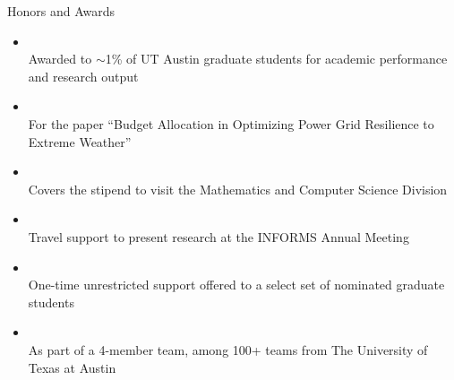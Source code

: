 \begin{rSection}{Honors and Awards}
\begin{itemize}
    \item {}\\
    {\small Awarded to $\sim$1\% of UT Austin graduate students for academic performance and research output}
    \item {}\\
    {\small For the paper ``Budget Allocation in Optimizing Power Grid Resilience to Extreme Weather''}
    \item {}\\
    {\small Covers the stipend to visit the Mathematics and Computer Science Division}
    \item {}\\
    {\small Travel support to present research at the INFORMS Annual Meeting}
    \item {}\\
    {\small One-time unrestricted support offered to a select set of nominated graduate students}
    \item {}\\
    {\small As part of a 4-member team, among 100+ teams from The University of Texas at Austin}
\end{itemize}
\end{rSection}
